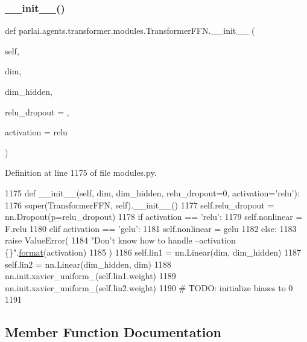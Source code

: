 \subsubsection{\texorpdfstring{\+\_\+\+\_\+init\+\_\+\+\_\+()}{\_\_init\_\_()}}
{\footnotesize\ttfamily def parlai.\+agents.\+transformer.\+modules.\+Transformer\+F\+F\+N.\+\_\+\+\_\+init\+\_\+\+\_\+ (\begin{DoxyParamCaption}\item[{}]{self,  }\item[{}]{dim,  }\item[{}]{dim\+\_\+hidden,  }\item[{}]{relu\+\_\+dropout = {},  }\item[{}]{activation = {\ttfamily \textquotesingle{}relu\textquotesingle{}} }\end{DoxyParamCaption})}



Definition at line 1175 of file modules.\+py.


\begin{DoxyCode}
1175     \textcolor{keyword}{def }\_\_init\_\_(self, dim, dim\_hidden, relu\_dropout=0, activation='relu'):
1176         super(TransformerFFN, self).\_\_init\_\_()
1177         self.relu\_dropout = nn.Dropout(p=relu\_dropout)
1178         \textcolor{keywordflow}{if} activation == \textcolor{stringliteral}{'relu'}:
1179             self.nonlinear = F.relu
1180         \textcolor{keywordflow}{elif} activation == \textcolor{stringliteral}{'gelu'}:
1181             self.nonlinear = gelu
1182         \textcolor{keywordflow}{else}:
1183             \textcolor{keywordflow}{raise} ValueError(
1184                 \textcolor{stringliteral}{"Don't know how to handle --activation \{\}"}.\hyperlink{namespaceparlai_1_1chat__service_1_1services_1_1messenger_1_1shared__utils_a32e2e2022b824fbaf80c747160b52a76}{format}(activation)
1185             )
1186         self.lin1 = nn.Linear(dim, dim\_hidden)
1187         self.lin2 = nn.Linear(dim\_hidden, dim)
1188         nn.init.xavier\_uniform\_(self.lin1.weight)
1189         nn.init.xavier\_uniform\_(self.lin2.weight)
1190         \textcolor{comment}{# TODO: initialize biases to 0}
1191 
\end{DoxyCode}


\subsection{Member Function Documentation}
\mbox{\label{classparlai_1_1agents_1_1transformer_1_1modules_1_1TransformerFFN_a54f8d1ec7c0c4228f78a3be843ab3003}} 
